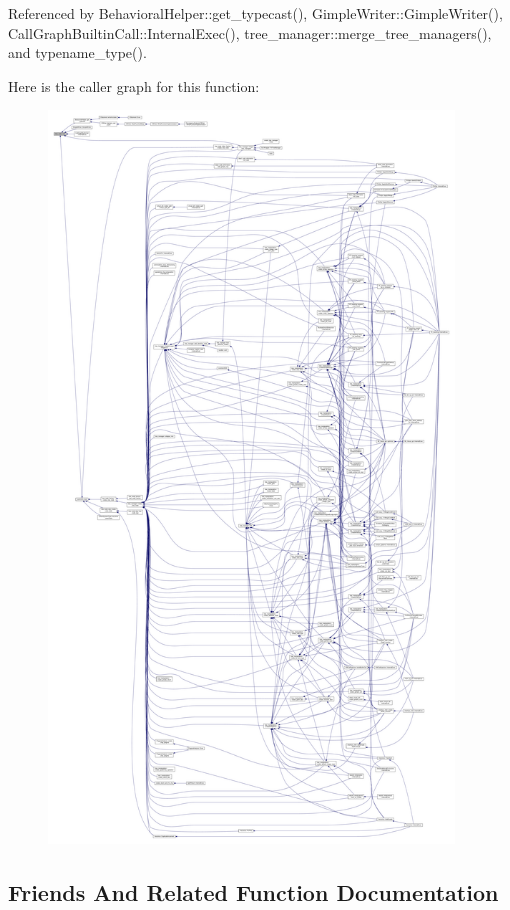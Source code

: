 Referenced by Behavioral\+Helper\+::get\+\_\+typecast(), Gimple\+Writer\+::\+Gimple\+Writer(), Call\+Graph\+Builtin\+Call\+::\+Internal\+Exec(), tree\+\_\+manager\+::merge\+\_\+tree\+\_\+managers(), and typename\+\_\+type().

Here is the caller graph for this function\+:
\nopagebreak
\begin{figure}[H]
\begin{center}
\leavevmode
\includegraphics[height=550pt]{df/dbf/classtree__node_aa9abba3f1b30e0be80b4a56b188c6ecc_icgraph}
\end{center}
\end{figure}


\subsection{Friends And Related Function Documentation}
\mbox{\label{classtree__node_a7abb3e56ee52f67b970bbafb18bbddc9}} 
